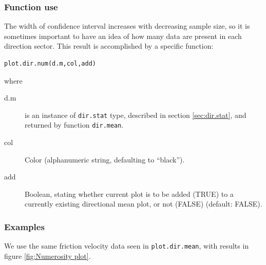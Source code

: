\documentclass[a4paper,10pt]{book}
\begin{document}
\subsubsection{Function use}

The width of confidence interval increases with decreasing sample size, so it is sometimes important to have an idea of how many data are present in each direction sector. This result is accomplished by a specific function:

\begin{verbatim}
plot.dir.num(d.m,col,add)
\end{verbatim}

\noindent where

\begin{description}
 \item[d.m] is an instance of \verb|dir.stat| type, described in section \ref{sec:dir.stat}, and returned by function \verb|dir.mean|.
 \item[col] Color (alphanumeric string, defaulting to ``black'').
 \item[add] Boolean, stating whether current plot is to be added (TRUE) to a currently existing directional mean plot, or not (FALSE) (default: FALSE).
\end{description}


\subsubsection{Examples}

We use the same friction velocity data seen in \verb|plot.dir.mean|, with results in figure \ref{fig:Numerosity plot}.
\end{document}
